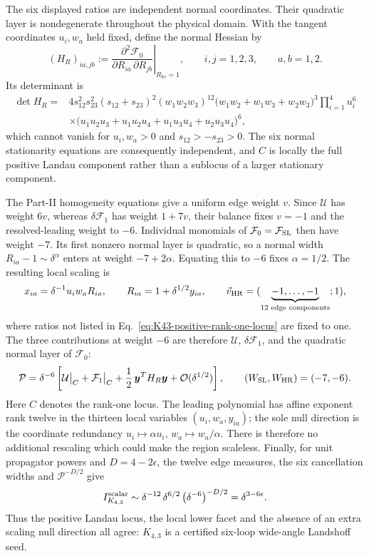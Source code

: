 \documentclass[a4paper,11pt]{article}
\newcommand{\FSL}{\mathcal F_{\rm SL}}
\newcommand{\WSL}{W_{\rm SL}}
\newcommand{\WHR}{W_{\rm HR}}
\newcommand{\vHR}{\vec v_{\rm HR}}
\begin{document}
The six displayed ratios are independent normal coordinates.  Their
quadratic layer is nondegenerate throughout the physical domain.  With the
tangent coordinates \(u_i,w_a\) held fixed, define the normal Hessian by
\[
 (H_R)_{ia,jb}
 :=\left.
 \frac{\partial^2\mathcal F_0}{\partial R_{ia}\,\partial R_{jb}}
 \right|_{R_{kc}=1},
 \qquad i,j=1,2,3,\qquad a,b=1,2.
\]
Its determinant is
\begin{align}
 \det H_R={}&4s_{12}^2s_{23}^2(s_{12}+s_{23})^2(w_1w_2w_3)^{12}
 \bigl(w_1w_2+w_1w_3+w_2w_3\bigr)^3
 \prod_{i=1}^4u_i^6
 \nonumber\\[-1mm]
 &\times
 \bigl(u_1u_2u_3+u_1u_2u_4+u_1u_3u_4+u_2u_3u_4\bigr)^6,
 \label{eq:K43-normal-Hessian}
\end{align}
which cannot vanish for \(u_i,w_a>0\) and \(s_{12}>-s_{23}>0\).  The six normal
stationarity equations are consequently independent, and \(C\) is locally
the full positive Landau component rather than a sublocus of a larger
stationary component.

The Part-II homogeneity equations give a uniform edge weight \(v\).  Since
\(\mathcal U\) has weight \(6v\), whereas
\(\delta\mathcal F_1\) has weight \(1+7v\), their balance fixes \(v=-1\)
and the resolved-leading weight to \(-6\).  Individual monomials of
\(\mathcal F_0=\FSL\) then have weight \(-7\).  Its first nonzero normal layer is
quadratic, so a normal width \(R_{ia}-1\sim\delta^\alpha\) enters at weight
\(-7+2\alpha\).  Equating this to \(-6\) fixes \(\alpha=1/2\).  The resulting
local scaling is
\begin{equation}
 x_{ia}=\delta^{-1}u_i w_a R_{ia},
 \qquad R_{ia}=1+\delta^{1/2}y_{ia},
 \qquad
 \vHR=(\underbrace{-1,\ldots,-1}_{12\text{ edge components}};1),
 \label{eq:K43-HR-scaling}
\end{equation}
where ratios not listed in Eq.~\eqref{eq:K43-positive-rank-one-locus} are
fixed to one.  The three contributions at weight \(-6\) are therefore
\(\mathcal U\), \(\delta\mathcal F_1\), and the quadratic normal layer of
\(\mathcal F_0\):
\begin{equation}
 \mathcal P
 =\delta^{-6}\left[
   \mathcal U\big|_C+\mathcal F_1\big|_C
   +\frac12\,\boldsymbol y^T H_R\boldsymbol y
   +\mathcal O(\delta^{1/2})\right],
 \qquad (\WSL,\WHR)=(-7,-6).
 \label{eq:K43-local-leading-polynomial}
\end{equation}
Here \(C\) denotes the rank-one locus.  The leading polynomial has affine
exponent rank twelve in the thirteen local variables
\((u_i,w_a,y_{ia})\); the sole null direction is the coordinate redundancy
\(u_i\mapsto\alpha u_i\), \(w_a\mapsto w_a/\alpha\).  There is therefore no
additional rescaling which could make the region scaleless.  Finally, for
unit propagator powers and \(D=4-2\epsilon\), the twelve edge measures, the
six cancellation widths and \(\mathcal P^{-D/2}\) give
\begin{equation}
 I_{K_{4,3}}^{\rm scalar}\sim
 \delta^{-12}\,\delta^{6/2}\,
 \bigl(\delta^{-6}\bigr)^{-D/2}
 =\delta^{3-6\epsilon}.
 \label{eq:K43-scalar-power-count}
\end{equation}
Thus the positive Landau locus, the local lower facet and the absence of an
extra scaling null direction all agree: \(K_{4,3}\) is a certified
six-loop wide-angle Landshoff seed.
\end{document}
